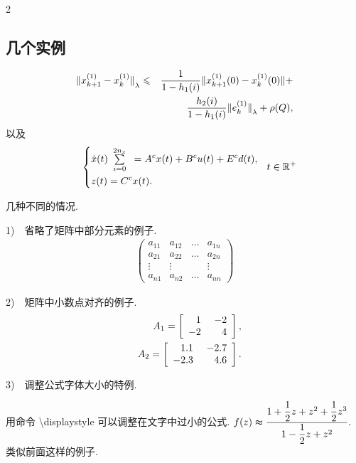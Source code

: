 \begin{multicols}{2}
\subsection{几个实例}
\begin{Exa}
\begin{eqnarray}
{\Arrowvert x^{(1)}_{k+1}-x^{(1)}_k\Arrowvert}_\lambda&\leqslant&
\frac{1}{1-h_1(i)}\Arrowvert x^{(1)}_{k+1}(0)-x^{(1)}_k(0)\Arrowvert+\notag\\
&&\frac{h_2(i)}{1-h_1(i)}{\Arrowvert
e^{(1)}_k\Arrowvert}_\lambda+\rho(Q),
\end{eqnarray}
以及
\begin{eqnarray}
&&\left\{\begin{aligned}
&\dot{x}(t)\begin{array}{l}\sum\limits_{i=0}^{2n_{x}}\end{array}=A^c x(t)+B^cu(t)+ E^c d(t),\\
&z(t)=C^c x(t).
\end{aligned}\right.\ \ t\in \mathbb{R}^+\notag\\
\end{eqnarray}\end{Exa}
\begin{Exa}几种不同的情况.
\end{Exa}

1)~~省略了矩阵中部分元素的例子.
\begin{eqnarray}
\begin{pmatrix}
a_{11}& a_{12}&\dots &a_{1n}\\
a_{21}& a_{22}&\dots &a_{2n}\\
\vdots&\vdots&       &\vdots\\
a_{n1}& a_{n2}&\dots &a_{nn}
\end{pmatrix}
\end{eqnarray}

2)~~矩阵中小数点对齐的例子.
\begin{eqnarray}
&&A_1=\left[\begin{array}{r@{ }l@{~~~~}r@{ }l} 1& &-2&\\-2& &4&
\end{array}\right],\\
&&A_2=\left[\begin{array}{r@{.}l@{~~~~}r@{.}l} 1&1 &-2&7\\-2&3 &4&6
\end{array}\right].
\end{eqnarray}

3)~~调整公式字体大小的特例.

用命令 \textbackslash displaystyle  可以调整在文字中过小的公式.
$f(z)\thickapprox{\displaystyle\frac{1+\dfrac{1}{2}z+z^2+\dfrac{1}{2}z^3}{1-\dfrac{1}{2}z+z^2}}.$
类似前面这样的例子.


\end{multicols}
